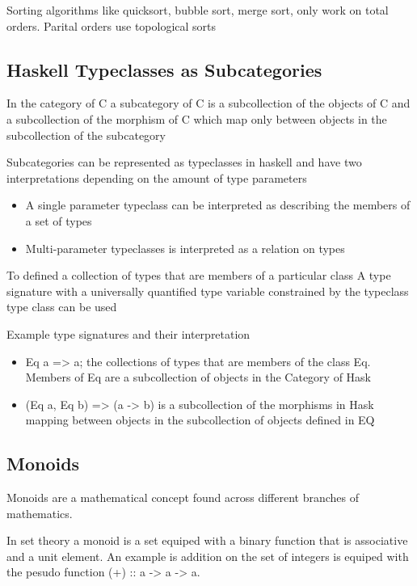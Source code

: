 \documentclass[12pt, letterpaper]{article}
\begin{document}
Sorting algorithms like quicksort, bubble sort, merge sort, only work on total orders. Parital orders use topological sorts

\subsection {Haskell Typeclasses as Subcategories}


In the category of C a subcategory of C is a subcollection of the objects of C and a subcollection of the morphism of C which map only between objects in the subcollection of the subcategory

Subcategories can be represented as typeclasses in haskell and have two interpretations depending on the amount of type parameters 

\begin{itemize}
  \item A single parameter typeclass can be interpreted as describing the members of a set of types
  \item Multi-parameter typeclasses is interpreted as a relation on types
\end{itemize}

To defined a collection of types that are members of a particular class A type signature with a universally quantified type variable constrained by the typeclass type class can be used

Example type signatures and their interpretation

\begin{itemize}
  \item Eq a => a; the collections of types that are members of the class Eq. Members of Eq are a subcollection of objects in the Category of Hask
  \item (Eq a, Eq b) => (a -> b) is a subcollection of the morphisms in Hask mapping between objects in the subcollection of objects defined in EQ 
\end{itemize}

\subsection{Monoids}

Monoids are a mathematical concept found across different branches of mathematics.

In set theory a monoid is a set equiped with a binary function that is associative and a unit element. An example is addition on the set of integers is equiped with the pesudo function (+) :: a -> a -> a.
\end{document}
